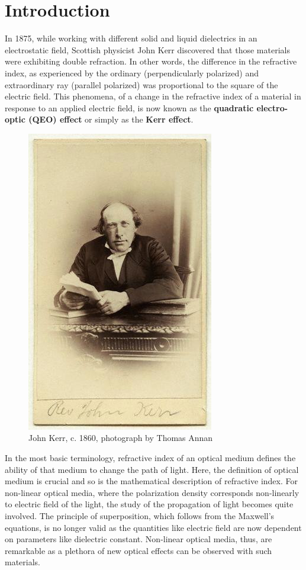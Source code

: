 \documentclass[%
 reprint,
 amsmath,amssymb,
 aps,
]{revtex4-2}
\begin{document}

\section{Introduction}
	In 1875, while working with different solid and liquid dielectrics in an electrostatic field, Scottish physicist John Kerr discovered that those materials were exhibiting double refraction. In other words, the difference in the refractive index, as experienced by the ordinary (perpendicularly polarized) and extraordinary ray (parallel polarized) was proportional to the square of the electric field. This phenomena, of a change in the refractive index of a material in response to an applied electric field, is now known as the \textbf{quadratic electro-optic (QEO) effect} or simply as the \textbf{Kerr effect}.
	\begin{figure}
		\centering
		\includegraphics[scale = 0.35]{kerr}
		\caption{John Kerr, c. 1860, photograph by Thomas Annan}
	\end{figure}
	\par
	In the most basic terminology, refractive index of an optical medium defines the ability of that medium to change the path of light. Here, the definition of optical medium is crucial and so is the mathematical description of refractive index. For non-linear optical media, where the polarization density corresponds non-linearly to electric field of the light, the study of the propagation of light becomes quite involved. The principle of superposition, which follows from the Maxwell's equations, is no longer valid as the quantities like electric field are now dependent on parameters like dielectric constant. Non-linear optical media, thus, are remarkable as a plethora of new optical effects can be observed with such materials.
\end{document}
